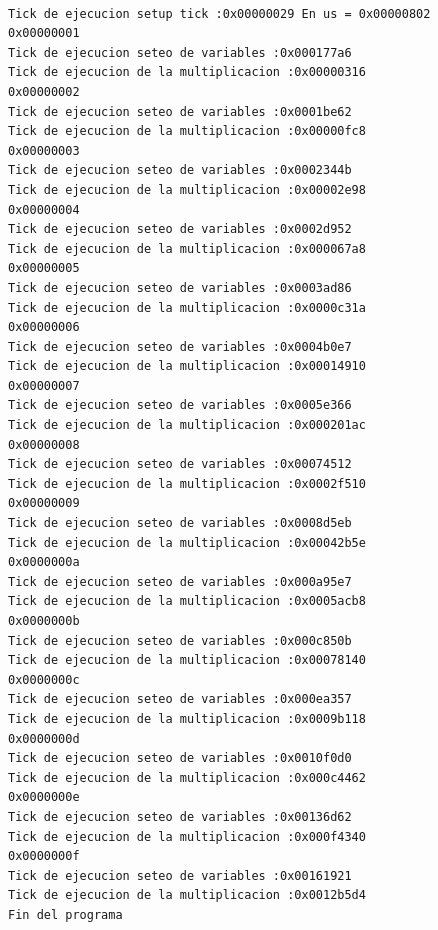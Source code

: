 \begin{verbatim}

Tick de ejecucion setup tick :0x00000029 En us = 0x00000802
0x00000001
Tick de ejecucion seteo de variables :0x000177a6
Tick de ejecucion de la multiplicacion :0x00000316
0x00000002
Tick de ejecucion seteo de variables :0x0001be62
Tick de ejecucion de la multiplicacion :0x00000fc8
0x00000003
Tick de ejecucion seteo de variables :0x0002344b
Tick de ejecucion de la multiplicacion :0x00002e98
0x00000004
Tick de ejecucion seteo de variables :0x0002d952
Tick de ejecucion de la multiplicacion :0x000067a8
0x00000005
Tick de ejecucion seteo de variables :0x0003ad86
Tick de ejecucion de la multiplicacion :0x0000c31a
0x00000006
Tick de ejecucion seteo de variables :0x0004b0e7
Tick de ejecucion de la multiplicacion :0x00014910
0x00000007
Tick de ejecucion seteo de variables :0x0005e366
Tick de ejecucion de la multiplicacion :0x000201ac
0x00000008
Tick de ejecucion seteo de variables :0x00074512
Tick de ejecucion de la multiplicacion :0x0002f510
0x00000009
Tick de ejecucion seteo de variables :0x0008d5eb
Tick de ejecucion de la multiplicacion :0x00042b5e
0x0000000a
Tick de ejecucion seteo de variables :0x000a95e7
Tick de ejecucion de la multiplicacion :0x0005acb8
0x0000000b
Tick de ejecucion seteo de variables :0x000c850b
Tick de ejecucion de la multiplicacion :0x00078140
0x0000000c
Tick de ejecucion seteo de variables :0x000ea357
Tick de ejecucion de la multiplicacion :0x0009b118
0x0000000d
Tick de ejecucion seteo de variables :0x0010f0d0
Tick de ejecucion de la multiplicacion :0x000c4462
0x0000000e
Tick de ejecucion seteo de variables :0x00136d62
Tick de ejecucion de la multiplicacion :0x000f4340
0x0000000f
Tick de ejecucion seteo de variables :0x00161921
Tick de ejecucion de la multiplicacion :0x0012b5d4
Fin del programa

\end{verbatim}



